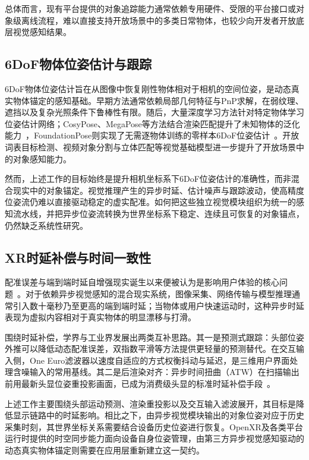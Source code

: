 \documentclass[review]{vgtc}
\begin{document}
总体而言，现有平台提供的对象追踪能力通常依赖专用硬件、受限的平台接口或对象级离线流程，难以直接支持开放场景中的多类日常物体，也较少向开发者开放底层视觉感知结果。

\subsection{6DoF物体位姿估计与跟踪}

6DoF物体位姿估计旨在从图像中恢复刚性物体相对于相机的空间位姿，是动态真实物体锚定的感知基础。早期方法通常依赖局部几何特征与PnP求解，在弱纹理、遮挡以及复杂光照条件下鲁棒性有限。随后，大量深度学习方法针对特定物体学习位姿估计网络；CosyPose、MegaPose等方法结合渲染匹配提升了未知物体的泛化能力~\cite{cosypose2020,megapose2022}，FoundationPose则实现了无需逐物体训练的零样本6DoF位姿估计~\cite{foundationpose2023}。开放词表目标检测、视频对象分割与立体匹配等视觉基础模型进一步提升了开放场景中的对象感知能力。

然而，上述工作的目标始终是提升相机坐标系下6DoF位姿估计的准确性，而非混合现实中的对象锚定。视觉推理产生的异步时延、估计噪声与跟踪波动，使高精度位姿流仍难以直接驱动稳定的虚实配准。如何把这些独立视觉模块组织为统一的感知流水线，并把异步位姿流转换为世界坐标系下稳定、连续且可恢复的对象锚点，仍然缺乏系统性研究。

\subsection{XR时延补偿与时间一致性}

配准误差与端到端时延自增强现实诞生以来便被认为是影响用户体验的核心问题~\cite{azuma1994improving,diluca2010latency}。对于依赖异步视觉感知的混合现实系统，图像采集、网络传输与模型推理通常引入数十毫秒乃至更高的端到端时延；当物体或用户快速运动时，这种异步时延表现为虚拟内容相对于真实物体的明显漂移与打滑。

围绕时延补偿，学界与工业界发展出两类互补思路。其一是预测式跟踪：头部位姿外推可以降低动态配准误差，双指数平滑等方法提供更轻量的预测替代。在交互输入侧，One Euro滤波器以速度自适应的方式权衡抖动与延迟，是三维用户界面处理含噪输入的常用基线。其二是后渲染对齐：异步时间扭曲（ATW）在扫描输出前用最新头显位姿重投影画面，已成为消费级头显的标准时延补偿手段~\cite{vanwaveren2016atw}。

上述工作主要围绕头部运动预测、渲染重投影以及交互输入滤波展开，其目标是降低显示链路中的时延影响。相比之下，由异步视觉模块输出的对象位姿对应于历史采集时刻，其世界坐标关系需要结合设备历史位姿进行恢复。OpenXR及各类平台运行时提供的时空同步能力面向设备自身位姿管理，由第三方异步视觉感知驱动的动态真实物体锚定则需要在应用层重新建立这一契约。
\end{document}
